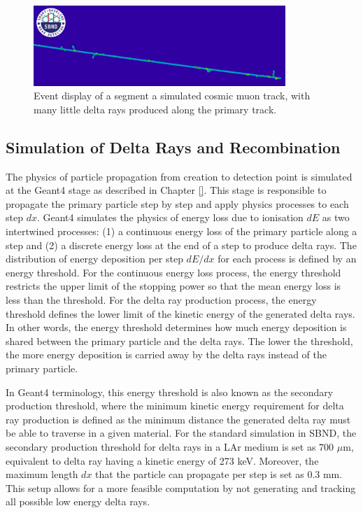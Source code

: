 \begin{figure}[thp] 
\centering    
\includegraphics[width=0.85\textwidth]{delta_ray_evd}
\caption[delta_ray_evd]{
Event display of a segment a simulated cosmic muon track, with many little delta rays produced along the primary track.
}
\label{fig:delta_ray_evd}
\end{figure}

\subsection{Simulation of Delta Rays and Recombination}
\label{sec:simDeltaRay}
The physics of particle propagation from creation to detection point is simulated at the Geant4 stage as described in Chapter \ref{}.
This stage is responsible to propagate the primary particle step by step and apply physics processes to each step $dx$.
Geant4 simulates the physics of energy loss due to ionisation $dE$ as two intertwined processes: (1) a continuous energy loss of the primary particle along a step and (2) a discrete energy loss at the end of a step to produce delta rays.
The distribution of energy deposition per step $dE/dx$ for each process is defined by an energy threshold.
For the continuous energy loss process, the energy threshold restricts the upper limit of the stopping power so that the mean energy loss is less than the threshold.
For the delta ray production process, the energy threshold defines the lower limit of the kinetic energy of the generated delta rays.
In other words, the energy threshold determines how much energy deposition is shared between the primary particle and the delta rays. 
The lower the threshold, the more energy deposition is carried away by the delta rays instead of the primary particle. 

In Geant4 terminology, this energy threshold is also known as the secondary production threshold, where the minimum kinetic energy requirement for delta ray production is defined as the minimum distance the generated delta ray must be able to traverse in a given material. 
For the standard simulation in SBND, the secondary production threshold for delta rays in a LAr medium is set as 700 $\mu$m, equivalent to delta ray having a kinetic energy of 273 keV.
Moreover, the maximum length $dx$ that the particle can propagate per step is set as 0.3 mm.
This setup allows for a more feasible computation by not generating and tracking all possible low energy delta rays.

